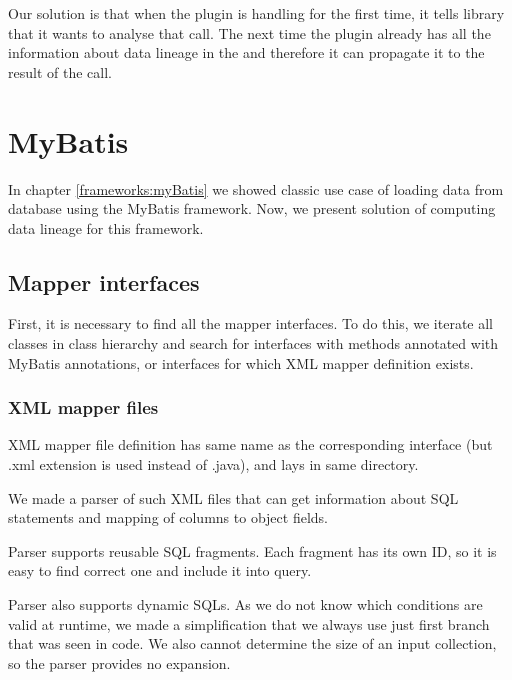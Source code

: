 Our solution is that when the plugin is handling
 for the first time, it tells library
that it wants to analyse that  call.
The next time the plugin already has all the information
about data lineage in the 
and therefore it can propagate it to the result of the  call.




\section{MyBatis}

In chapter \ref{frameworks:myBatis} we showed classic use case of loading data from database
using the MyBatis framework. Now, we present solution of computing data lineage for this framework.



\subsection{Mapper interfaces}

First, it is necessary to find all the mapper interfaces.
To do this, we iterate all classes in class hierarchy and search 
for interfaces with methods annotated with MyBatis annotations,
or interfaces for which XML mapper definition exists.



\subsubsection{XML mapper files}

XML mapper file definition has same name as the corresponding interface
(but .xml extension is used instead of .java), and lays in same directory.

We made a parser of such XML files that can get information about SQL statements
and mapping of columns to object fields.

Parser supports reusable SQL fragments. Each fragment has its own ID,
so it is easy to find correct one and include it into query.

Parser also supports dynamic SQLs. As we do not know which conditions are valid
at runtime, we made a simplification that we always use just first branch that
was seen in code.
We also cannot determine the size of an input collection, so the parser provides no expansion.



